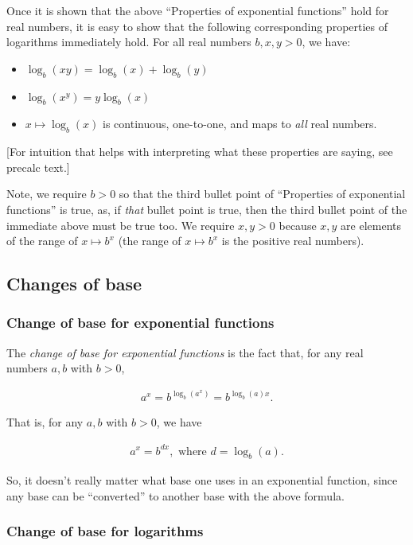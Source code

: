 Once it is shown that the above ``Properties of exponential functions'' hold for real numbers, it is easy to show that the following corresponding properties of logarithms immediately hold. For all real numbers $b, x, y > 0$, we have:

\begin{itemize}
    \item $\log_b(xy) = \log_b(x) + \log_b(y)$
    \item $\log_b(x^y) = y\log_b(x)$
    \item $x \mapsto \log_b(x)$ is continuous, one-to-one, and maps to \textit{all} real numbers.
\end{itemize}

[For intuition that helps with interpreting what these properties are saying, see precalc text.]

Note, we require $b > 0$ so that the third bullet point of ``Properties of exponential functions'' is true, as, if \textit{that} bullet point is true, then the third bullet point of the immediate above must be true too. We require $x, y > 0$ because $x, y$ are elements of the range of $x \mapsto b^x$ (the range of $x \mapsto b^x$ is the positive real numbers).

\subsection*{Changes of base}

\subsubsection*{Change of base for exponential functions}

The \textit{change of base for exponential functions} is the fact that, for any real numbers $a, b$ with $b > 0$,

\begin{align*}
    a^x = b^{\log_b(a^x)} = b^{\log_b(a) x}.
\end{align*}

That is, for any $a, b$ with $b > 0$, we have

\begin{align*}
    a^x = b^{dx}, \text{ where $d = \log_b(a)$}.
\end{align*}

So, it doesn't really matter what base one uses in an exponential function, since any base can be ``converted'' to another base with the above formula.

\subsubsection*{Change of base for logarithms}

